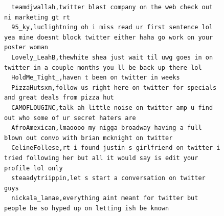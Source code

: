 \begin{figure}[htpb]
\begin{verbatim}
  teamdjwallah,twitter blast company on the web check out ni marketing gt rt
  95_ky,luclightning oh i miss read ur first sentence lol yea mine doesnt block twitter either haha go work on your poster woman
  Lovely_LeahB,thewhite shea just wait til uwg goes in on twitter in a couple months you ll be back up there lol
  HoldMe_Tight_,haven t been on twitter in weeks
  PizzaHutsxm,follow us right here on twitter for specials and great deals from pizza hut
  CAMOFLOUGINC,talk ah little noise on twitter amp u find out who some of ur secret haters are
  AfroAmexican,lmaoooo my nigga broadway having a full blown out convo with brian mcknight on twitter
  CelineFollese,rt i found justin s girlfriend on twitter i tried following her but all it would say is edit your profile lol only
  steaadytriippin,let s start a conversation on twitter guys
  nickala_lanae,everything aint meant for twitter but people be so hyped up on letting ish be known


\end{verbatim}
\end{figure}
